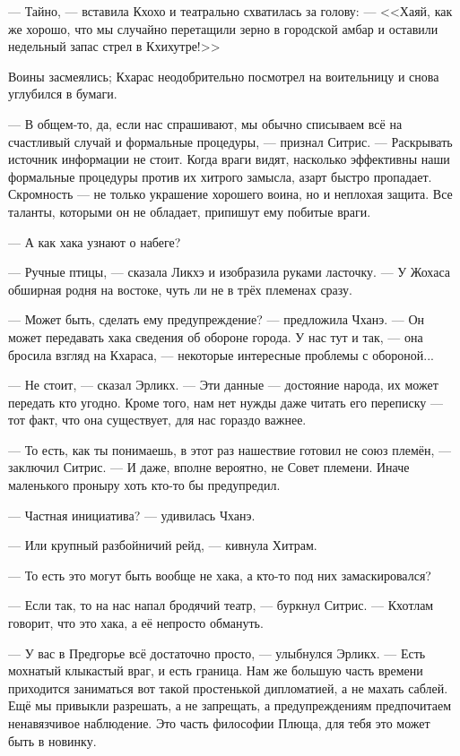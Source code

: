 --- Тайно, --- вставила Кхохо и театрально схватилась за голову:
--- <<Хаяй, как же хорошо, что мы случайно перетащили зерно в городской амбар и оставили недельный запас стрел в Кхихутре!>>

Воины засмеялись;
Кхарас неодобрительно посмотрел на воительницу и снова углубился в бумаги.

--- В общем-то, да, если нас спрашивают, мы обычно списываем всё на счастливый случай и формальные процедуры, --- признал Ситрис.
--- Раскрывать источник информации не стоит.
Когда враги видят, насколько эффективны наши формальные процедуры против их хитрого замысла, азарт быстро пропадает.
Скромность --- не только украшение хорошего воина, но и неплохая защита.
Все таланты, которыми он не обладает, припишут ему побитые враги.

--- А как хака узнают о набеге?

--- Ручные птицы, --- сказала Ликхэ и изобразила руками ласточку.
--- У Жохаса обширная родня на востоке, чуть ли не в трёх племенах сразу.

--- Может быть, сделать ему предупреждение? --- предложила Чханэ.
--- Он может передавать хака сведения об обороне города.
У нас тут и так, --- она бросила взгляд на Кхараса, --- некоторые интересные проблемы с обороной...

--- Не стоит, --- сказал Эрликх.
--- Эти данные --- достояние народа, их может передать кто угодно.
Кроме того, нам нет нужды даже читать его переписку --- тот факт, что она существует, для нас гораздо важнее.

--- То есть, как ты понимаешь, в этот раз нашествие готовил не союз племён, --- заключил Ситрис.
--- И даже, вполне вероятно, не Совет племени.
Иначе маленького проныру хоть кто-то бы предупредил.

--- Частная инициатива? --- удивилась Чханэ.

--- Или крупный разбойничий рейд, --- кивнула Хитрам.

--- То есть это могут быть вообще не хака, а кто-то под них замаскировался?

--- Если так, то на нас напал бродячий театр, --- буркнул Ситрис.
--- Кхотлам говорит, что это хака, а её непросто обмануть.

--- У вас в Предгорье всё достаточно просто, --- улыбнулся Эрликх.
--- Есть мохнатый клыкастый враг, и есть граница.
Нам же большую часть времени приходится заниматься вот такой простенькой дипломатией, а не махать саблей.
Ещё мы привыкли разрешать, а не запрещать, а предупреждениям предпочитаем ненавязчивое наблюдение.
Это часть философии Плюща, для тебя это может быть в новинку.

